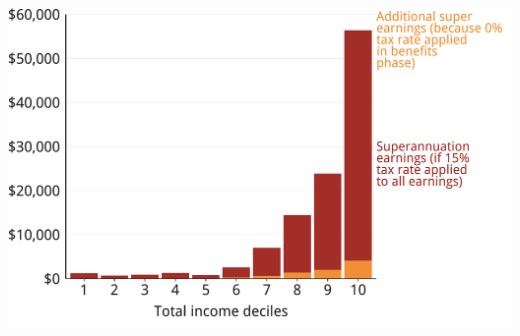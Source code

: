 \documentclass[tikz]{standalone}\usepackage[]{graphicx}\usepackage[]{color}
\newenvironment{knitrout}{}{} %
\begin{document}
\begin{knitrout}
\color{fgcolor}
\includegraphics[width=11.000in,height=7.00in]{./Super-tax-targeting/b5-super-atlas/Figure6-1-1} 

\end{knitrout}
\end{document}
